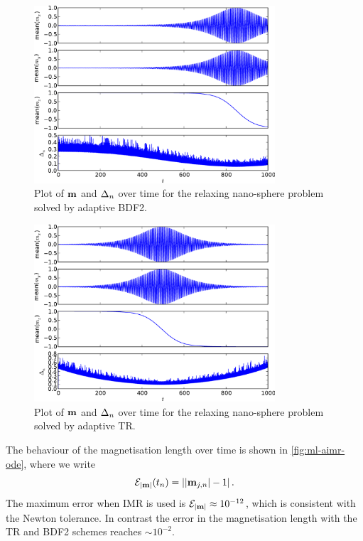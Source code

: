 \begin{figure}
  \centering
  \includegraphics[width=0.8\textwidth]{plots/aimr-sphere-relax/bdf21-meanmxsvs-meanmysvs-meanmzsvs-dtsvstimes.pdf}
  \caption{Plot of $\boldsymbol{\mathrm{m}}$ and $\Delta_{n}$ over time for the relaxing nano-sphere problem solved by adaptive BDF2.}
  \label{fig:bdf2-llg-ode}
\end{figure}


\begin{figure}
  \centering
  \includegraphics[width=0.8\textwidth]{plots/aimr-sphere-relax/tr1-meanmxsvs-meanmysvs-meanmzsvs-dtsvstimes.pdf}
  \caption{Plot of $\boldsymbol{\mathrm{m}}$ and $\Delta_{n}$ over time for the relaxing nano-sphere problem solved by adaptive TR.}
  \label{fig:tr-llg-ode}
\end{figure}

The behaviour of the magnetisation length over time is shown in \cref{fig:ml-aimr-ode}, where we write
\begin{equation}
  \mathcal{E}_{\left|{\boldsymbol{\mathrm{m}}} \right|}(t_n) =  \left|{\left|{\boldsymbol{\mathrm{m}}_{j,n}} \right| - 1} \right|.
\end{equation}
The maximum error when IMR is used is $\mathcal{E}_{\left|{\boldsymbol{\mathrm{m}}} \right|} \approx 10^{-12}$, which is consistent with the Newton tolerance.
In contrast the error in the magnetisation length with the TR and BDF2 schemes reaches $\sim 10^{-2}$.

